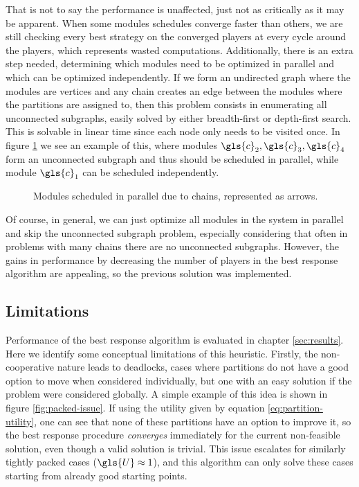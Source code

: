 \documentclass[main.tex]{subfiles}
\begin{document}
That is not to say the performance is unaffected, just not as critically as it may be apparent.
When some modules schedules converge faster than others, we are still checking every best strategy on the converged players at every cycle around the players, which represents wasted computations.
Additionally, there is an extra step needed, determining which modules need to be optimized in parallel and which can be optimized independently.
If we form an undirected graph where the modules are vertices and any chain creates an edge between the modules where the partitions are assigned to, then this problem consists in enumerating all unconnected subgraphs, easily solved by either breadth-first or depth-first search.
This is solvable in linear time since each node only needs to be visited once.
In figure \ref{fig:parallel-modules} we see an example of this, where modules $\gls{c}_2, \gls{c}_3, \gls{c}_4$ form an unconnected subgraph and thus should be scheduled in parallel, while module $\gls{c}_1$ can be scheduled independently.

\begin{figure}[htbp]
    \centering
    \resizebox{0.7\linewidth}{!}{}
    \caption{Modules scheduled in parallel due to chains, represented as arrows.}
    \label{fig:parallel-modules}
\end{figure}

Of course, in general, we can just optimize all modules in the system in parallel and skip the unconnected subgraph problem, especially considering that often in problems with many chains there are no unconnected subgraphs.
However, the gains in performance by decreasing the number of players in the best response algorithm are appealing, so the previous solution was implemented.

\subsection{Limitations}
\label{sec:limitations}

Performance of the best response algorithm is evaluated in chapter \ref{sec:results}.
Here we identify some conceptual limitations of this heuristic.
Firstly, the non-cooperative nature leads to deadlocks, cases where partitions do not have a good option to move when considered individually, but one with an easy solution if the problem were considered globally. 
A simple example of this idea is shown in figure \ref{fig:packed-issue}.
If using the utility given by equation \ref{eq:partition-utility}, one can see that none of these partitions have an option to improve it, so the best response procedure \textit{converges} immediately for the current non-feasible solution, even though a valid solution is trivial.
This issue escalates for similarly tightly packed cases ($\gls{U}\approx 1$), and this algorithm can only solve these cases starting from already good starting points. 
\end{document}
